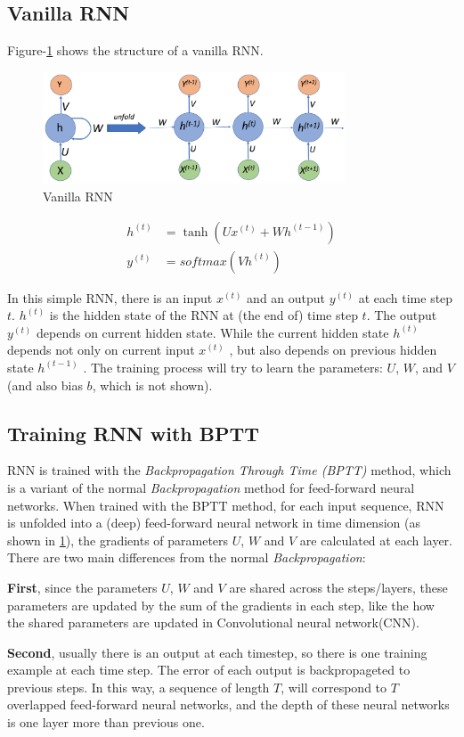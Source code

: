 \documentclass{article}
\begin{document}
\subsection{Vanilla RNN}
Figure-\ref{fig:vanillaRNN} shows the structure of a vanilla RNN.
\begin{figure}
	\centering
	\includegraphics[width=0.8\textwidth]{rnn}
	\caption{Vanilla RNN}
	\label{fig:vanillaRNN}
\end{figure}
\begin{align}
h^{(t)} &= \tanh(Ux^{(t)} + Wh^{(t-1)})\\
y^{(t)} &= softmax(Vh^{(t)})
\end{align}

In this simple RNN, there is an input $x^{(t)}$ and an output $y^{(t)}$ at each time step $t$. $h^{(t)}$ is the hidden state of the RNN at (the end of) time step $t$. The output  $y^{(t)}$ depends on current hidden state. While the current hidden state  $h^{(t)}$  depends not only on current input  $x^{(t)}$ ,
but also depends on previous hidden state  $h^{(t-1)}$ .
The training process will try to learn the parameters: $U$, $W$, and $V$ (and also bias $b$, which is not shown).

\subsection{Training RNN with BPTT}\label{sec:train-rnn}
RNN is trained with the \textit{Backpropagation Through Time (BPTT)} method, which is a variant of the normal \textit{Backpropagation} method for  feed-forward neural networks. When trained with the BPTT method, for each input sequence, RNN is unfolded into a (deep) feed-forward neural network in time dimension (as shown in \ref{fig:vanillaRNN}), the gradients of parameters $U$, $W$ and $V$ are calculated at each layer. 
There are two main differences from the normal \textit{Backpropagation}:  \par
 \textbf{First}, since the parameters $U$, $W$ and $V$ are shared across the steps/layers, these parameters are updated by the sum of the gradients in each step, like the how the shared parameters are updated in Convolutional neural network(CNN). \par
 \textbf{Second}, usually there is an output at each timestep,  so there is one training example at each time step.
 The error of each output is backpropageted to previous steps. In this way, a sequence of  length $T$, will correspond to $T$ overlapped feed-forward neural networks, and the depth of these neural networks is one layer more than previous one.
\end{document}
